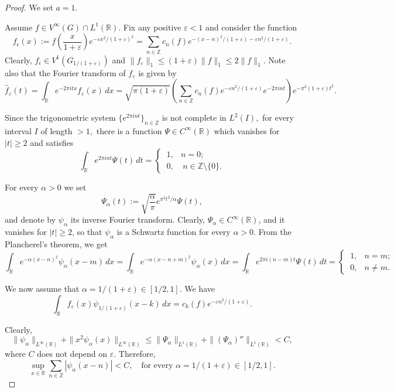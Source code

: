 \documentclass[10pt,a4paper]{amsart}
\newcommand{\R}{{\mathbb R}} \newcommand{\Q}{{\mathbb Q}} \newcommand{\Z}{{\mathbb Z}} \newcommand{\N}{{\mathbb N}}
\begin{document}
\begin{proof} We set $a=1.$

  Assume $f\in V^\infty(G)\cap L^1(\R)$. Fix any positive $\varepsilon<1$ and consider the function 
 $$f_\epsilon(x):=f\left(\frac{x}{1+\varepsilon}\right)e^{-\varepsilon x^2/(1+\varepsilon)^2}=\sum_{n\in\Z}c_n(f)e^{-(x-n)^2/(1+\varepsilon)-\varepsilon n^2/(1+\varepsilon)}.$$Clearly, $f_\epsilon\in V^1(G_{1/(1+\varepsilon)})$ and $\|f_\varepsilon\|_1\leq (1+\varepsilon)\|f\|_1\leq 2\|f\|_1.$ Note also that the Fourier transform of $f_\varepsilon$ is given by
 $$\hat f_\varepsilon(t)=\int_\R e^{-2\pi i tx}f_\varepsilon(x)\,dx=\sqrt{\pi(1+\varepsilon)}\left(\sum_{n\in\Z}c_n(f)e^{-\varepsilon n^2/(1+\varepsilon)}e^{-2\pi i n t}\right) e^{-\pi^2(1+\varepsilon)t^2}.$$

    Since the trigonometric system $\{e^{2\pi int}\}_{n\in\Z}$ is not complete in $L^2(I),$ for every interval $I$ of length $>1,$ there is a function $\Psi\in C^\infty(\R)$ which vanishes for $|t|\geq 2$ and satisfies 
    $$\int_\R e^{2\pi int}\Psi(t)\,dt=
    \begin{cases}
 \  1,& n=0;\\
 \ 0,& \ n\in\Z\setminus\{0\}.
\end{cases}
   $$

For every $\alpha>0$ we set $$\Psi_\alpha(t):=\sqrt{\frac{\alpha}{\pi}}e^{\pi^2 t^2/\alpha}\Psi(t),$$and denote by $\psi_\alpha$ its inverse Fourier transform. Clearly, $\Psi_\alpha\in C^\infty(\R)$, and   it vanishes for $|t|\geq 2 $, so that $\psi_\alpha$ is a Schwartz function for every $\alpha>0.$ From the Plancherel's theorem, we get
$$\int_\R e^{-\alpha(x-n)^2}\psi_\alpha(x-m)\,dx=\int_\R e^{-\alpha(x-n+m)^2}\psi_\alpha(x)\,dx=\int_\R e^{2\pi i(n-m)t}\Psi(t)\,dt= \begin{cases}
 \  1,& n=m;\\
 \ 0,&  n \neq m.
\end{cases}$$

We now assume that $\alpha=1/(1+\varepsilon)\in[1/2,1]$. We have
\begin{equation}\label{eq:ortck}
    \int_\R f_\varepsilon(x) \psi_{1/(1+\varepsilon)}(x-k) \, dx=c_k(f)e^{-\varepsilon n^2/(1+\varepsilon)}.
\end{equation}

Clearly, 
$$\|\psi_\alpha\|_{L^\infty(\R)}+ \| x^2\psi_\alpha(x)\|_{L^\infty(\R)}\leq \|\Psi_\alpha\|_{L^1(\R)}+ \|(\Psi_\alpha)''\|_{L^1(\R)}<C,$$where $C$ does not depend on $\varepsilon.$
Therefore, 
 \begin{equation}\label{epsi}\sup_{x\in\R}\sum_{n\in\Z}|\psi_{\alpha}(x-n)| <C,\quad \text{for every } \alpha=1/(1+\varepsilon)\in [1/2,1].\end{equation}



\end{proof}
\end{document}
